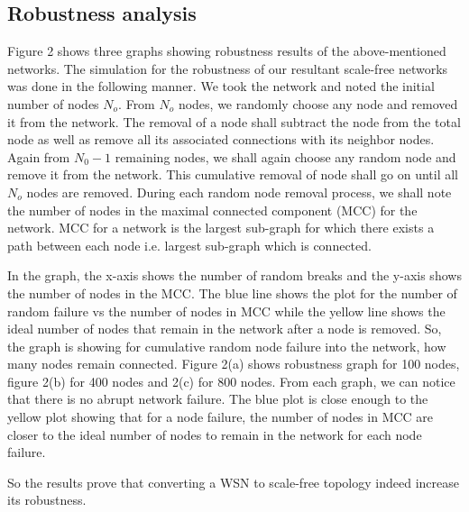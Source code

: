 \documentclass{article}
\begin{document}
	\subsection{Robustness analysis}
	Figure 2 shows three graphs showing robustness results of the above-mentioned networks. The simulation for the robustness of our resultant scale-free networks was done in the following manner. We took the network and noted the initial number of nodes $N_o$. From $N_o$ nodes, we randomly choose any node and removed it from the network. The removal of a node shall subtract the node from the total node as well as remove all its associated connections with its neighbor nodes. Again from $N_0 - 1$ remaining nodes, we shall again choose any random node and remove it from the network. This cumulative removal of node shall go on until all $N_o$ nodes are removed. During each random node removal process, we shall note the number of nodes in the maximal connected component (MCC) for the network. MCC for a network is the largest sub-graph for which there exists a path between each node i.e. largest sub-graph which is connected. 
	
	In the graph, the x-axis shows the number of random breaks and the y-axis shows the number of nodes in the MCC. The blue line shows the plot for the number of random failure vs the number of nodes in MCC while the yellow line shows the ideal number of nodes that remain in the network after a node is removed. So, the graph is showing for cumulative random node failure into the network, how many nodes remain connected. Figure 2(a) shows robustness graph for 100 nodes, figure 2(b) for 400 nodes and 2(c) for 800 nodes. From each graph, we can notice that there is no abrupt network failure. The blue plot is close enough to the yellow plot showing that for a node failure, the number of nodes in MCC are closer to the ideal number of nodes to remain in the network for each node failure.
	
	So the results prove that converting a WSN to scale-free topology indeed increase its robustness.
	
\end{document}
